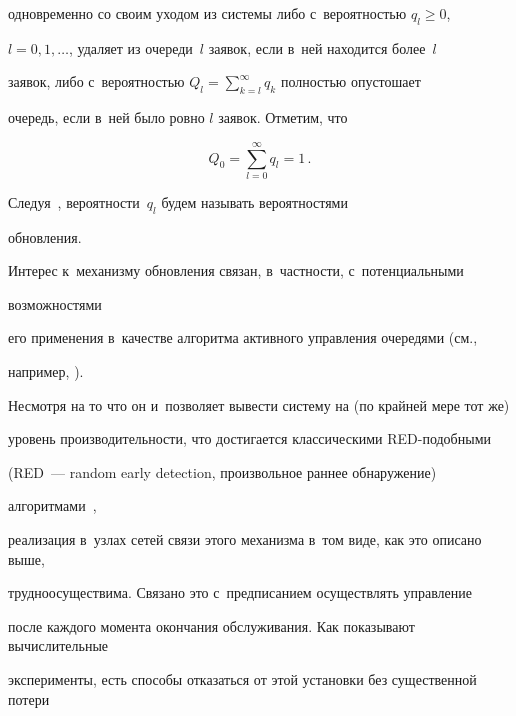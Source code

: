одновременно со своим уходом из сис\-те\-мы либо с~вероятностью $q_l\ge 0 $, 

$l=0,1,\dots$, удаляет из очереди~$l$ заявок, если в~ней находится более~$l$ 

заявок, либо с~вероятностью ${Q_l=\sum_{k=l}^\infty q_k}$ пол\-ностью опустошает 

очередь, если в~ней было ровно $l$ заявок. Отметим, что 



\vspace*{-1pt}



\noindent

$$

Q_0=\sum\limits_{l=0}^\infty 

q_l=1\,.

$$



\vspace*{-3pt}



\noindent

 Следуя~\cite{11}, вероятности~$q_l$ будем называть вероятностями 

обновления.





Интерес к~механизму обновления связан, в~частности, с~потенциальными 

возможностями

его применения в~качестве алгоритма активного управ\-ле\-ния очередями (см., 

например, \cite{ss1}).

Несмотря на то что он и~позволяет вывести сис\-те\-му на (по крайней мере тот же)

уровень производительности, что достигается классическими RED-по\-доб\-ны\-ми 

(RED~--- random early detection, произвольное раннее обнаружение)

алгоритмами~\cite{ss4},

реализация в~узлах сетей связи этого механизма в~том виде, как это описано выше,

трудноосуществима. Связано это с~предписанием осуществлять управление

после каждого момента окончания обслуживания. Как показывают вычислительные

эксперименты, есть способы отказаться от этой установки без существенной потери

